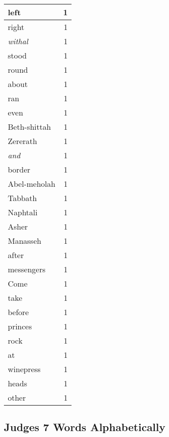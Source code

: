 \begin{center}
\begin{longtable}{l|r}
left & 1\\ \hline 
right & 1\\ \hline 
\emph{withal} & 1\\ \hline 
stood & 1\\ \hline 
round & 1\\ \hline 
about & 1\\ \hline 
ran & 1\\ \hline 
even & 1\\ \hline 
Beth-shittah & 1\\ \hline 
Zererath & 1\\ \hline 
\emph{and} & 1\\ \hline 
border & 1\\ \hline 
Abel-meholah & 1\\ \hline 
Tabbath & 1\\ \hline 
Naphtali & 1\\ \hline 
Asher & 1\\ \hline 
Manasseh & 1\\ \hline 
after & 1\\ \hline 
messengers & 1\\ \hline 
Come & 1\\ \hline 
take & 1\\ \hline 
before & 1\\ \hline 
princes & 1\\ \hline 
rock & 1\\ \hline 
at & 1\\ \hline 
winepress & 1\\ \hline 
heads & 1\\ \hline 
other & 1\\ \hline 
\end{longtable}
\end{center}





\subsection{Judges 7 Words Alphabetically}


\normalsize
 
